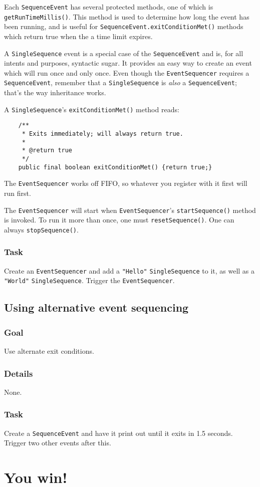 \documentclass[a4paper]{article}
\begin{document}
Each \lstinline{SequenceEvent} has several protected methods, one of which is \lstinline{getRunTimeMillis()}. This method is used to determine how long the event has been running, and is useful for \lstinline{SequenceEvent.exitConditionMet()} methods which return true when the a time limit expires.

A \lstinline{SingleSequence} event is a special case of the \lstinline{SequenceEvent} and is, for all intents and purposes, syntactic sugar. It provides an easy way to create an event which will run once and only once. Even though the \lstinline{EventSequencer} requires a \lstinline{SequenceEvent}, remember that a \lstinline{SingleSequence} is \textit{also} a \lstinline{SequenceEvent}; that's the way inheritance works.

A \lstinline{SingleSequence}'s \lstinline{exitConditionMet()} method reads:

\begin{lstlisting}
	/**
	 * Exits immediately; will always return true.
	 * 
	 * @return true
	 */
	public final boolean exitConditionMet() {return true;}
\end{lstlisting}

The \lstinline{EventSequencer} works off FIFO, so whatever you register with it first will run first.

The \lstinline{EventSequencer} will start when \lstinline{EventSequencer}'s \lstinline{startSequence()} method is invoked. To run it more than once, one must \lstinline{resetSequence()}. One can always \lstinline{stopSequence()}. 
\subsubsection{Task} Create an \lstinline{EventSequencer} and add a \lstinline{"Hello"} \lstinline{SingleSequence} to it, as well as a \lstinline{"World"} \lstinline{SingleSequence}. Trigger the \lstinline{EventSequencer}.

\pagebreak\subsection{Using alternative event sequencing}
\subsubsection{Goal} Use alternate exit conditions.
\subsubsection{Details} None.
\subsubsection{Task} Create a \lstinline{SequenceEvent} and have it print out until it exits in 1.5 seconds. Trigger two other events after this.

\section*{You win!}
\end{document}
